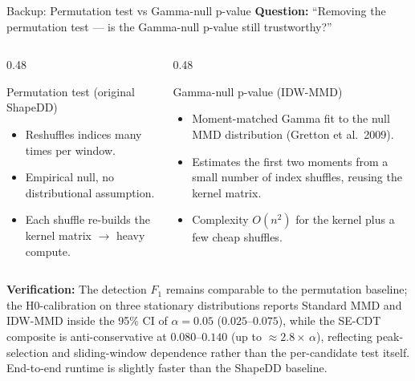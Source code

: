\documentclass[aspectratio=169,10pt]{beamer}
\begin{document}
\begin{frame}{Backup: Permutation test vs Gamma-null p-value}
	\textbf{Question:} ``Removing the permutation test --- is the Gamma-null p-value still trustworthy?''

	\vspace{0.5em}
	\begin{columns}[T]
		\begin{column}{0.48\textwidth}
			\begin{alertblock}{Permutation test (original ShapeDD)}
				\begin{itemize}
					\item Reshuffles indices many times per window.
					\item Empirical null, no distributional assumption.
					\item Each shuffle re-builds the kernel matrix $\to$ heavy compute.
				\end{itemize}
			\end{alertblock}
		\end{column}
		\begin{column}{0.48\textwidth}
			\begin{exampleblock}{Gamma-null p-value (IDW-MMD)}
				\begin{itemize}
					\item Moment-matched Gamma fit to the null MMD distribution (Gretton et al.\ 2009).
					\item Estimates the first two moments from a small number of index shuffles, reusing the kernel matrix.
					\item Complexity $O(n^2)$ for the kernel plus a few cheap shuffles.
				\end{itemize}
			\end{exampleblock}
		\end{column}
	\end{columns}

	\vspace{0.5em}
	\textbf{Verification:} The detection $F_1$ remains comparable to the permutation baseline; the H0-calibration on three stationary distributions reports Standard MMD and IDW-MMD inside the 95\% CI of $\alpha = 0.05$ ($0.025$--$0.075$), while the SE-CDT composite is anti-conservative at $0.080$--$0.140$ (up to $\approx 2.8\times\,\alpha$), reflecting peak-selection and sliding-window dependence rather than the per-candidate test itself. End-to-end runtime is slightly faster than the ShapeDD baseline.
\end{frame}
\end{document}
